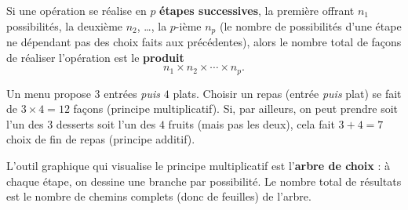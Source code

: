 \begin{theoreme}
Si une opération se réalise en $p$ \textbf{étapes successives}, la première offrant
$n_1$ possibilités, la deuxième $n_2$, \dots, la $p$-ième $n_p$ (le nombre de
possibilités d'une étape ne dépendant pas des choix faits aux précédentes), alors le
nombre total de façons de réaliser l'opération est le \textbf{produit}
\[ n_1\times n_2\times\cdots\times n_p. \]
\end{theoreme}

\begin{exemple}
Un menu propose $3$ entrées \emph{puis} $4$ plats. Choisir un repas (entrée
\emph{puis} plat) se fait de $3\times 4=12$ façons (principe multiplicatif). Si, par
ailleurs, on peut prendre soit l'un des $3$ desserts soit l'un des $4$ fruits (mais
pas les deux), cela fait $3+4=7$ choix de fin de repas (principe additif).
\end{exemple}

L'outil graphique qui visualise le principe multiplicatif est l'\textbf{arbre de
choix} : à chaque étape, on dessine une branche par possibilité. Le nombre total de
résultats est le nombre de chemins complets (donc de feuilles) de l'arbre.

\begin{illus}
\end{illus}

